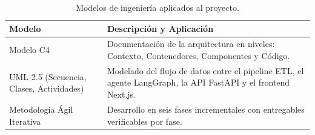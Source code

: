\documentclass[12pt, letterpaper]{report}
\begin{document}
\begin{table}[H]
  \centering
  \renewcommand{\arraystretch}{1.3}
  \caption{Modelos de ingenier\'{i}a aplicados al proyecto.}
  \label{tab:modelos_ing}
  \begin{tabular}{|p{}|p{}|}
  \hline
  \textbf{Modelo} & \textbf{Descripci\'{o}n y Aplicaci\'{o}n} \\ \hline
  Modelo C4 & Documentaci\'{o}n de la arquitectura en niveles: Contexto, Contenedores, Componentes y C\'{o}digo. \\ \hline
  UML 2.5 (Secuencia, Clases, Actividades) & Modelado del flujo de datos entre el pipeline ETL, el agente LangGraph, la API FastAPI y el frontend Next.js. \\ \hline
  Metodolog\'{i}a \'{A}gil Iterativa & Desarrollo en seis fases incrementales con entregables verificables por fase. \\ \hline
  \end{tabular}
\end{table}
\end{document}
